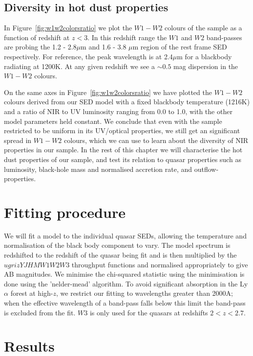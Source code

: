 \subsection{Diversity in hot dust properties}

In Figure~\ref{fig:w1w2colorsratio} we plot the $W1 - W2$ colours of the sample as a function of redshift at $z<3$. 
In this redshift range the $W1$ and $W2$ band-passes are probing the 1.2 - 2.8$\mu$m and 1.6 - 3.8 $\mu$m region of the rest frame SED respectively. 
For reference, the peak wavelength is at 2.4$\mu$m for a blackbody radiating at 1200K. 
At any given redshift we see a $\sim 0.5$ mag dispersion in the $W1-W2$ colours. 

On the same axes in Figure~\ref{fig:w1w2colorsratio} we have plotted the $W1-W2$ colours derived from our SED model with a fixed blackbody temperature (1216K) and a ratio of NIR to UV luminosity ranging from 0.0 to 1.0, with the other model parameters held constant. 
We conclude that even with the sample restricted to be uniform in its UV/optical properties, we still get an significant spread in $W1-W2$ colours, which we can use to learn about the diversity of NIR properties in our sample. 
In the rest of this chapter we will characterise the hot dust properties of our sample, and test its relation to quasar properties such as luminosity, black-hole mass and normalised accretion rate, and outflow-properties. 

\section{Fitting procedure}

We will fit a model to the individual quasar SEDs, allowing the temperature and normalisation of the black body component to vary. 
The model spectrum is redshifted to the redshift of the quasar being fit and is then multiplied by the $ugrizYJHMW1W2W3$ throughput functions and normalised appropriately to give AB magnitudes. 
We minimise the chi-squared statistic using the minimisation is done using the 'nelder-mead' algorithm.
To avoid significant absorption in the Ly$\alpha$ forest at high-$z$, we restrict our fitting to wavelengths greater than 2000A; when the effective wavelength of a band-pass falls below this limit the band-pass is excluded from the fit. 
$W3$ is only used for the quasars at redshifts $2 < z < 2.7$. 

\section{Results}

